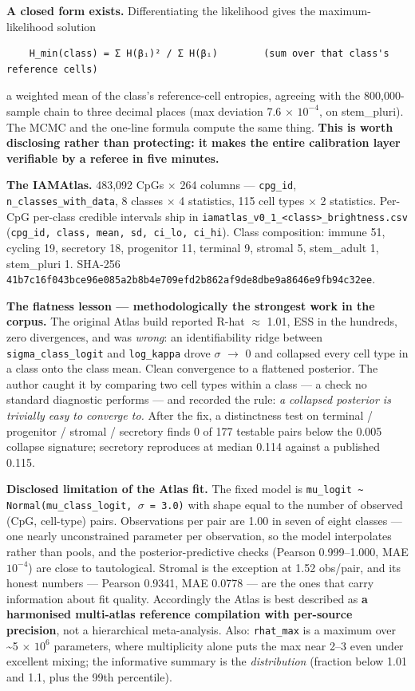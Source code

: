 \documentclass[12pt,a4paper]{article}
\begin{document}
\textbf{A closed form exists.} Differentiating the likelihood gives the maximum-likelihood solution


\begin{lstlisting}
    H_min(class) = Σ H(βᵢ)² / Σ H(βᵢ)        (sum over that class's reference cells)
\end{lstlisting}


a weighted mean of the class's reference-cell entropies, agreeing with the 800,000-sample chain to three decimal places (max deviation 7.6 $\times$ $10^{-4}$, on stem\_pluri). The MCMC and the one-line formula compute the same thing. \textbf{This is worth disclosing rather than protecting: it makes the entire calibration layer verifiable by a referee in five minutes.}


\textbf{The IAMAtlas.} 483,092 CpGs $\times$ 264 columns --- \texttt{cpg\_id}, \texttt{n\_classes\_with\_data}, 8 classes $\times$ 4 statistics, 115 cell types $\times$ 2 statistics. Per-CpG per-class credible intervals ship in \texttt{iamatlas\_v0\_1\_<class>\_brightness.csv} (\texttt{cpg\_id, class, mean, sd, ci\_lo, ci\_hi}). Class composition: immune 51, cycling 19, secretory 18, progenitor 11, terminal 9, stromal 5, stem\_adult 1, stem\_pluri 1. SHA-256 \texttt{41b7c16f043bce96e085a2b8b4e709efd2b862af9de8dbe9a8646e9fb94c32ee}.


\textbf{The flatness lesson --- methodologically the strongest work in the corpus.} The original Atlas build reported R-hat $\approx$ 1.01, ESS in the hundreds, zero divergences, and was \textit{wrong}: an identifiability ridge between \texttt{sigma\_class\_logit} and \texttt{log\_kappa} drove $\sigma$ $\rightarrow$ 0 and collapsed every cell type in a class onto the class mean. Clean convergence to a flattened posterior. The author caught it by comparing two cell types within a class --- a check no standard diagnostic performs --- and recorded the rule: \textit{a collapsed posterior is trivially easy to converge to.} After the fix, a distinctness test on terminal / progenitor / stromal / secretory finds 0 of 177 testable pairs below the 0.005 collapse signature; secretory reproduces at median 0.114 against a published 0.115.


\textbf{Disclosed limitation of the Atlas fit.} The fixed model is \texttt{mu\_logit \textasciitilde{} Normal(mu\_class\_logit, $\sigma$ = 3.0)} with shape equal to the number of observed (CpG, cell-type) pairs. Observations per pair are 1.00 in seven of eight classes --- one nearly unconstrained parameter per observation, so the model interpolates rather than pools, and the posterior-predictive checks (Pearson 0.999--1.000, MAE $10^{-4}$) are close to tautological. Stromal is the exception at 1.52 obs/pair, and its honest numbers --- Pearson 0.9341, MAE 0.0778 --- are the ones that carry information about fit quality. Accordingly the Atlas is best described as \textbf{a harmonised multi-atlas reference compilation with per-source precision}, not a hierarchical meta-analysis. Also: \texttt{rhat\_max} is a maximum over \textasciitilde{}5 $\times$ $10^{6}$ parameters, where multiplicity alone puts the max near 2--3 even under excellent mixing; the informative summary is the \textit{distribution} (fraction below 1.01 and 1.1, plus the 99th percentile).
\end{document}

